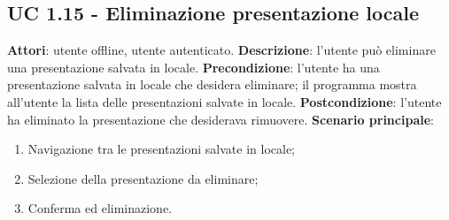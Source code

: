 \subsection{UC 1.15 - Eliminazione presentazione locale}{
	\label{uc1.15}
	\textbf{Attori}: utente offline, utente autenticato.
	\textbf{Descrizione}: l'utente può eliminare una presentazione salvata in locale.
	\textbf{Precondizione}: l'utente ha una presentazione salvata in locale che desidera eliminare; il programma mostra all'utente la lista delle presentazioni salvate in locale.
	\textbf{Postcondizione}: l'utente ha eliminato la presentazione che desiderava rimuovere.
	\textbf{Scenario principale}:
	\begin{enumerate}
		\item Navigazione tra le presentazioni salvate in locale;
		\item Selezione della presentazione da eliminare;
		\item Conferma ed eliminazione.
	\end{enumerate}
}